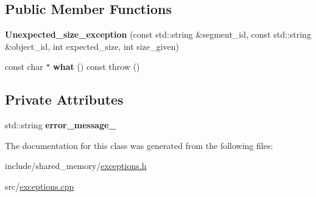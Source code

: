 \subsection*{Public Member Functions}
\begin{DoxyCompactItemize}
\item 
\mbox{\label{classshared__memory_1_1Unexpected__size__exception_acc8b3dc1f6879b44e7ccd7f22d13198b}} 
{\bfseries Unexpected\+\_\+size\+\_\+exception} (const std\+::string \&segment\+\_\+id, const std\+::string \&object\+\_\+id, int expected\+\_\+size, int size\+\_\+given)
\item 
\mbox{\label{classshared__memory_1_1Unexpected__size__exception_a020206032708aad4ad2baa6de11925ac}} 
const char $\ast$ {\bfseries what} () const  throw ()
\end{DoxyCompactItemize}
\subsection*{Private Attributes}
\begin{DoxyCompactItemize}
\item 
\mbox{\label{classshared__memory_1_1Unexpected__size__exception_a6f22d0e0207e97cafe4f78192c913c55}} 
std\+::string {\bfseries error\+\_\+message\+\_\+}
\end{DoxyCompactItemize}


The documentation for this class was generated from the following files\+:\begin{DoxyCompactItemize}
\item 
include/shared\+\_\+memory/\hyperlink{exceptions_8h}{exceptions.\+h}\item 
src/\hyperlink{exceptions_8cpp}{exceptions.\+cpp}\end{DoxyCompactItemize}
